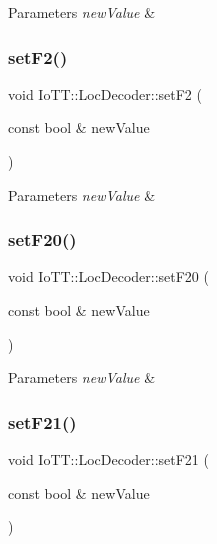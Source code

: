 \begin{DoxyParams}{Parameters}
{\em new\+Value} & \\
\hline
\end{DoxyParams}
\mbox{\label{classIoTT_1_1LocDecoder_ad7df25a09f6a25b9869eba5671f55973}} 
\subsubsection{\texorpdfstring{set\+F2()}{setF2()}}
{\footnotesize\ttfamily void Io\+T\+T\+::\+Loc\+Decoder\+::set\+F2 (\begin{DoxyParamCaption}\item[{const bool \&}]{new\+Value }\end{DoxyParamCaption})}


\begin{DoxyParams}{Parameters}
{\em new\+Value} & \\
\hline
\end{DoxyParams}
\mbox{\label{classIoTT_1_1LocDecoder_a4014c83224b461c36f190c40a86e8444}} 
\subsubsection{\texorpdfstring{set\+F20()}{setF20()}}
{\footnotesize\ttfamily void Io\+T\+T\+::\+Loc\+Decoder\+::set\+F20 (\begin{DoxyParamCaption}\item[{const bool \&}]{new\+Value }\end{DoxyParamCaption})}


\begin{DoxyParams}{Parameters}
{\em new\+Value} & \\
\hline
\end{DoxyParams}
\mbox{\label{classIoTT_1_1LocDecoder_a35458b4c739bfeceb9823a82e06cbf7d}} 
\subsubsection{\texorpdfstring{set\+F21()}{setF21()}}
{\footnotesize\ttfamily void Io\+T\+T\+::\+Loc\+Decoder\+::set\+F21 (\begin{DoxyParamCaption}\item[{const bool \&}]{new\+Value }\end{DoxyParamCaption})}


